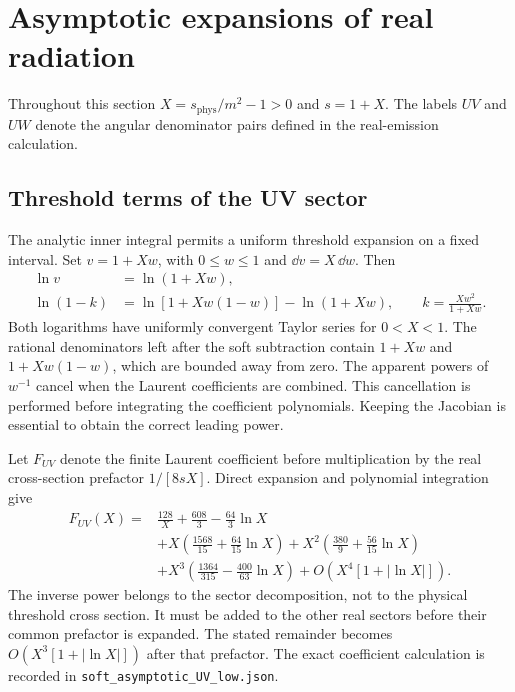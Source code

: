 \section{Asymptotic expansions of real radiation}
Throughout this section $X=s_{\mathrm{phys}}/m^2-1>0$ and $s=1+X$.
The labels $UV$ and $UW$ denote the angular denominator pairs
defined in the real-emission calculation.

\subsection{Threshold terms of the UV sector}
The analytic inner integral permits a uniform threshold expansion on a
fixed interval.  Set $v=1+Xw$, with $0\leq w\leq1$ and
$\dd v=X\,\dd w$.  Then
\begin{align}
 \ln v&=\ln(1+Xw),\\
 \ln(1-k)&=\ln[1+Xw(1-w)]-\ln(1+Xw),\qquad
 k=\frac{Xw^2}{1+Xw}.
\end{align}
Both logarithms have uniformly convergent Taylor series for $0<X<1$.
The rational denominators left after the soft subtraction contain
$1+Xw$ and $1+Xw(1-w)$, which are bounded away from zero.
The apparent powers of $w^{-1}$ cancel when the Laurent coefficients
are combined.  This cancellation is performed before integrating the
coefficient polynomials.  Keeping the Jacobian is essential to obtain
the correct leading power.

Let $F_{UV}$ denote the finite Laurent coefficient before multiplication
by the real cross-section prefactor $1/[8s X]$.  Direct expansion and
polynomial integration give
\begin{align}
 F_{UV}(X)={}&\frac{128}{X}+\frac{608}{3}-\frac{64}{3}\ln X\\
 &+X\left(\frac{1568}{15}+\frac{64}{15}\ln X\right)
 +X^2\left(\frac{380}{9}+\frac{56}{15}\ln X\right)\\
 &+X^3\left(\frac{1364}{315}-\frac{400}{63}\ln X\right)
                    +O\!\left(X^4[1+|\ln X|]\right).
\end{align}
The inverse power belongs to the sector decomposition, not to the
physical threshold cross section.  It must be added to the other real
sectors before their common prefactor is expanded.  The stated remainder
becomes $O(X^3[1+|\ln X|])$ after that prefactor.
The exact coefficient calculation is recorded in
\nolinkurl{soft_asymptotic_UV_low.json}.

